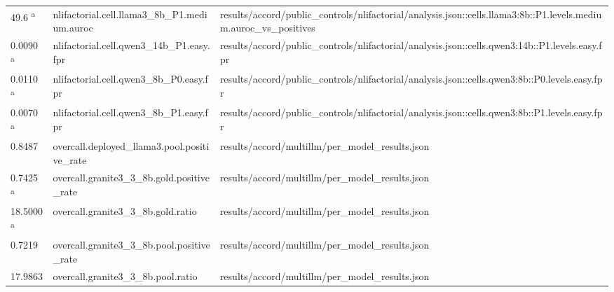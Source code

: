 \begin{longtable}{@{}p{0.7in}p{1.9in}p{2.6in}@{}}
49.6 \textsuperscript{a} & nlifactorial.\allowbreak{}cell.\allowbreak{}llama3\_8b\_P1.\allowbreak{}medium.\allowbreak{}auroc & results/\allowbreak{}accord/\allowbreak{}public\_controls/\allowbreak{}nlifactorial/\allowbreak{}analysis.\allowbreak{}json::cells.\allowbreak{}llama3:8b::P1.\allowbreak{}levels.\allowbreak{}medium.\allowbreak{}auroc\_vs\_positives\\
0.0090 \textsuperscript{a} & nlifactorial.\allowbreak{}cell.\allowbreak{}qwen3\_14b\_P1.\allowbreak{}easy.\allowbreak{}fpr & results/\allowbreak{}accord/\allowbreak{}public\_controls/\allowbreak{}nlifactorial/\allowbreak{}analysis.\allowbreak{}json::cells.\allowbreak{}qwen3:14b::P1.\allowbreak{}levels.\allowbreak{}easy.\allowbreak{}fpr\\
0.0110 \textsuperscript{a} & nlifactorial.\allowbreak{}cell.\allowbreak{}qwen3\_8b\_P0.\allowbreak{}easy.\allowbreak{}fpr & results/\allowbreak{}accord/\allowbreak{}public\_controls/\allowbreak{}nlifactorial/\allowbreak{}analysis.\allowbreak{}json::cells.\allowbreak{}qwen3:8b::P0.\allowbreak{}levels.\allowbreak{}easy.\allowbreak{}fpr\\
0.0070 \textsuperscript{a} & nlifactorial.\allowbreak{}cell.\allowbreak{}qwen3\_8b\_P1.\allowbreak{}easy.\allowbreak{}fpr & results/\allowbreak{}accord/\allowbreak{}public\_controls/\allowbreak{}nlifactorial/\allowbreak{}analysis.\allowbreak{}json::cells.\allowbreak{}qwen3:8b::P1.\allowbreak{}levels.\allowbreak{}easy.\allowbreak{}fpr\\
0.8487 & overcall.\allowbreak{}deployed\_llama3.\allowbreak{}pool.\allowbreak{}positive\_rate & results/\allowbreak{}accord/\allowbreak{}multillm/\allowbreak{}per\_model\_results.\allowbreak{}json\\
0.7425 \textsuperscript{a} & overcall.\allowbreak{}granite3\_3\_8b.\allowbreak{}gold.\allowbreak{}positive\_rate & results/\allowbreak{}accord/\allowbreak{}multillm/\allowbreak{}per\_model\_results.\allowbreak{}json\\
18.5000 \textsuperscript{a} & overcall.\allowbreak{}granite3\_3\_8b.\allowbreak{}gold.\allowbreak{}ratio & results/\allowbreak{}accord/\allowbreak{}multillm/\allowbreak{}per\_model\_results.\allowbreak{}json\\
0.7219 & overcall.\allowbreak{}granite3\_3\_8b.\allowbreak{}pool.\allowbreak{}positive\_rate & results/\allowbreak{}accord/\allowbreak{}multillm/\allowbreak{}per\_model\_results.\allowbreak{}json\\
17.9863 & overcall.\allowbreak{}granite3\_3\_8b.\allowbreak{}pool.\allowbreak{}ratio & results/\allowbreak{}accord/\allowbreak{}multillm/\allowbreak{}per\_model\_results.\allowbreak{}json\\

\end{longtable}
